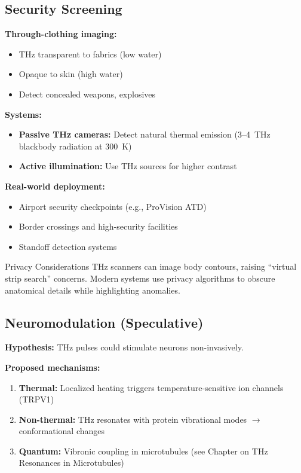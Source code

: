 \subsection{Security Screening}
\label{subsec:security-screening}

\textbf{Through-clothing imaging:}
\begin{itemize}
\item THz transparent to fabrics (low water)
\item Opaque to skin (high water)
\item Detect concealed weapons, explosives
\end{itemize}

\textbf{Systems:}
\begin{itemize}
\item \textbf{Passive THz cameras:} Detect natural thermal emission (3--4~THz blackbody radiation at 300~K)
\item \textbf{Active illumination:} Use THz sources for higher contrast
\end{itemize}

\textbf{Real-world deployment:}
\begin{itemize}
\item Airport security checkpoints (e.g., ProVision ATD)
\item Border crossings and high-security facilities
\item Standoff detection systems
\end{itemize}

\begin{calloutbox}{Privacy Considerations}
THz scanners can image body contours, raising ``virtual strip search'' concerns. Modern systems use privacy algorithms to obscure anatomical details while highlighting anomalies.
\end{calloutbox}

\subsection{Neuromodulation (Speculative)}
\label{subsec:neuromodulation}

\textbf{Hypothesis:} THz pulses could stimulate neurons non-invasively.

\textbf{Proposed mechanisms:}
\begin{enumerate}
\item \textbf{Thermal:} Localized heating triggers temperature-sensitive ion channels (TRPV1)
\item \textbf{Non-thermal:} THz resonates with protein vibrational modes $\rightarrow$ conformational changes
\item \textbf{Quantum:} Vibronic coupling in microtubules (see Chapter on THz Resonances in Microtubules)
\end{enumerate}

